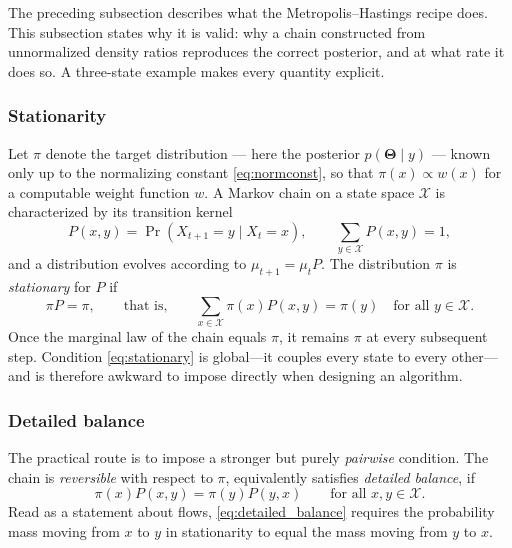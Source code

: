 \documentclass[11pt]{article}
\begin{document}
The preceding subsection describes what the Metropolis--Hastings recipe does.
This subsection states why it is valid: why a chain constructed from
unnormalized density ratios reproduces the correct posterior, and at what rate
it does so. A three-state example makes every quantity explicit.

\subsubsection*{Stationarity}

Let $\pi$ denote the target distribution --- here the posterior
$p(\bm{\Theta}\mid y)$ --- known only up to the normalizing constant
\eqref{eq:normconst}, so that $\pi(x)\propto w(x)$ for a computable weight
function $w$. A Markov chain on a state space $\mathcal{X}$ is characterized by
its transition kernel
\begin{equation}
    P(x,y)=\Pr\left(X_{t+1}=y \mid X_t=x\right),
    \qquad \sum_{y\in\mathcal{X}}P(x,y)=1,
    \label{eq:kernel}
\end{equation}
and a distribution evolves according to $\mu_{t+1}=\mu_t P$. The distribution
$\pi$ is \emph{stationary} for $P$ if
\begin{equation}
    \pi P=\pi,
    \qquad\text{that is,}\qquad
    \sum_{x\in\mathcal{X}}\pi(x)P(x,y)=\pi(y)
    \quad\text{for all }y\in\mathcal{X}.
    \label{eq:stationary}
\end{equation}
Once the marginal law of the chain equals $\pi$, it remains $\pi$ at every
subsequent step. Condition \eqref{eq:stationary} is global---it couples every
state to every other---and is therefore awkward to impose directly when
designing an algorithm.

\subsubsection*{Detailed balance}

The practical route is to impose a stronger but purely \emph{pairwise}
condition. The chain is \emph{reversible} with respect to $\pi$, equivalently
satisfies \emph{detailed balance}, if
\begin{equation}
    \pi(x)P(x,y)=\pi(y)P(y,x)
    \qquad\text{for all }x,y\in\mathcal{X}.
    \label{eq:detailed_balance}
\end{equation}
Read as a statement about flows, \eqref{eq:detailed_balance} requires the
probability mass moving from $x$ to $y$ in stationarity to equal the mass
moving from $y$ to $x$.
\end{document}
